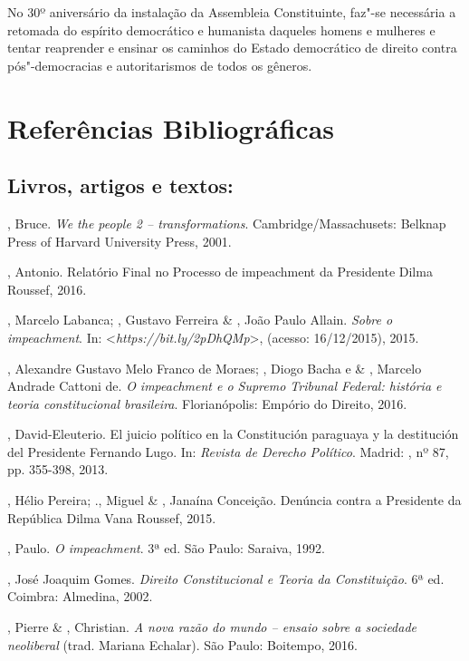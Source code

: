 No 30º aniversário da instalação da Assembleia Constituinte, faz"-se
necessária a retomada do espírito democrático e humanista daqueles
homens e mulheres e tentar reaprender e ensinar os caminhos do Estado
democrático de direito contra pós"-democracias e autoritarismos de todos
os gêneros.

\section{Referências Bibliográficas}

\subsection{Livros, artigos e textos:}

\begin{Parskip}
, Bruce. \emph{We the people 2 -- transformations}.
Cambridge/Massachusets: Belknap Press of Harvard University Press, 2001.

, Antonio. Relatório Final no Processo de impeachment da
Presidente Dilma Roussef, 2016.

, Marcelo Labanca; , Gustavo Ferreira \& , João
Paulo Allain. \emph{Sobre o impeachment}. In: \textless{}\emph{https://bit.ly/2pDhQMp}\textgreater{},
(acesso: 16/12/2015), 2015.

, Alexandre Gustavo Melo Franco de Moraes; , Diogo Bacha e \&
, Marcelo Andrade Cattoni de. \emph{O impeachment e o Supremo
Tribunal Federal: história e teoria constitucional brasileira}.
Florianópolis: Empório do Direito, 2016.

, David-Eleuterio. El juicio político en la Constitución
paraguaya y la destitución del Presidente Fernando Lugo. In:
\emph{Revista de Derecho Político}. Madrid: , nº 87, pp. 355-398,
2013.

, Hélio Pereira; ., Miguel \& , Janaína Conceição.
Denúncia contra a Presidente da República Dilma Vana Roussef, 2015.

, Paulo. \emph{O impeachment}. 3ª ed. São Paulo: Saraiva, 1992.

, José Joaquim Gomes. \emph{Direito Constitucional e Teoria da
Constituição}. 6ª ed. Coimbra: Almedina, 2002.

, Pierre \& , Christian. \emph{A nova razão do mundo -- ensaio
sobre a sociedade neoliberal} (trad. Mariana Echalar). São Paulo:
Boitempo, 2016.


\end{Parskip}
